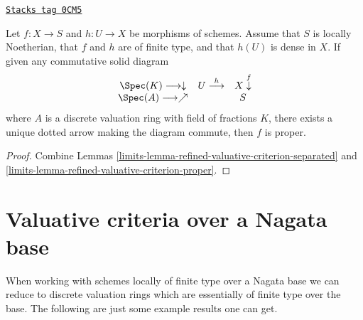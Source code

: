 \begin{lemma}
\label{limits-lemma-refined-valuative-criterion-universally-closed}
\href{https://stacks.math.columbia.edu/tag/0CM5}{\texttt{Stacks tag 0CM5}}

Let $f : X \to S$ and $h : U \to X$ be morphisms of schemes.
Assume that $S$ is locally Noetherian, that $f$ and $h$ are of finite type, and
that $h(U)$ is dense in $X$. If given any commutative solid diagram
$$
\begin{array}{ccc}\Spec(K) \longrightarrow\downarrow & U \overset{h}{\longrightarrow} & X \overset{f}{\downarrow} \\ \Spec(A) \longrightarrow\nearrow &  & S\end{array}
$$
where $A$ is a discrete valuation ring with field of fractions $K$, there
exists a unique dotted arrow making the diagram commute, then $f$ is proper.
\end{lemma}

\begin{proof}

Combine Lemmas \ref{limits-lemma-refined-valuative-criterion-separated} and
\ref{limits-lemma-refined-valuative-criterion-proper}.
\end{proof}

\section{Valuative criteria over a Nagata base}
\label{limits-section-nagata-valuative}
When working with schemes locally of finite type over a
Nagata base we can reduce to discrete valuation rings
which are essentially of finite type over the base.
The following are just some example results one can get.

